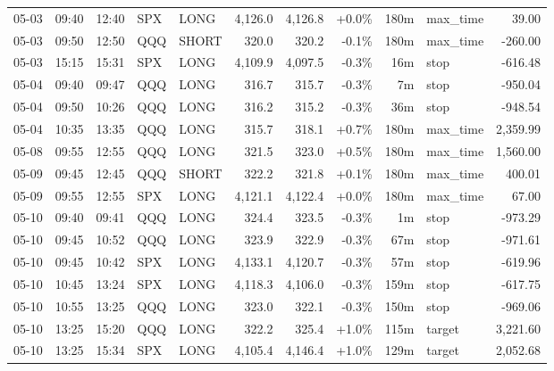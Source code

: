 \documentclass[11pt,a4paper,twoside]{article}
\begin{document}
\begin{center}
\begin{longtable}{>{\color{txtmain}}l l l l l r r r r >{\color{txtmain}}l r}
05-03 & 09:40 & 12:40 & SPX & LONG & 4,126.0 & 4,126.8 & \textcolor{wingreen}{+0.0\%} & 180m & max\_time & \textcolor{wingreen}{39.00} \\
05-03 & 09:50 & 12:50 & QQQ & SHORT & 320.0 & 320.2 & \textcolor{lossred}{-0.1\%} & 180m & max\_time & \textcolor{lossred}{-260.00} \\
05-03 & 15:15 & 15:31 & SPX & LONG & 4,109.9 & 4,097.5 & \textcolor{lossred}{-0.3\%} & 16m & stop & \textcolor{lossred}{-616.48} \\
05-04 & 09:40 & 09:47 & QQQ & LONG & 316.7 & 315.7 & \textcolor{lossred}{-0.3\%} & 7m & stop & \textcolor{lossred}{-950.04} \\
05-04 & 09:50 & 10:26 & QQQ & LONG & 316.2 & 315.2 & \textcolor{lossred}{-0.3\%} & 36m & stop & \textcolor{lossred}{-948.54} \\
05-04 & 10:35 & 13:35 & QQQ & LONG & 315.7 & 318.1 & \textcolor{wingreen}{+0.7\%} & 180m & max\_time & \textcolor{wingreen}{2,359.99} \\
05-08 & 09:55 & 12:55 & QQQ & LONG & 321.5 & 323.0 & \textcolor{wingreen}{+0.5\%} & 180m & max\_time & \textcolor{wingreen}{1,560.00} \\
05-09 & 09:45 & 12:45 & QQQ & SHORT & 322.2 & 321.8 & \textcolor{wingreen}{+0.1\%} & 180m & max\_time & \textcolor{wingreen}{400.01} \\
05-09 & 09:55 & 12:55 & SPX & LONG & 4,121.1 & 4,122.4 & \textcolor{wingreen}{+0.0\%} & 180m & max\_time & \textcolor{wingreen}{67.00} \\
05-10 & 09:40 & 09:41 & QQQ & LONG & 324.4 & 323.5 & \textcolor{lossred}{-0.3\%} & 1m & stop & \textcolor{lossred}{-973.29} \\
05-10 & 09:45 & 10:52 & QQQ & LONG & 323.9 & 322.9 & \textcolor{lossred}{-0.3\%} & 67m & stop & \textcolor{lossred}{-971.61} \\
05-10 & 09:45 & 10:42 & SPX & LONG & 4,133.1 & 4,120.7 & \textcolor{lossred}{-0.3\%} & 57m & stop & \textcolor{lossred}{-619.96} \\
05-10 & 10:45 & 13:24 & SPX & LONG & 4,118.3 & 4,106.0 & \textcolor{lossred}{-0.3\%} & 159m & stop & \textcolor{lossred}{-617.75} \\
05-10 & 10:55 & 13:25 & QQQ & LONG & 323.0 & 322.1 & \textcolor{lossred}{-0.3\%} & 150m & stop & \textcolor{lossred}{-969.06} \\
05-10 & 13:25 & 15:20 & QQQ & LONG & 322.2 & 325.4 & \textcolor{wingreen}{+1.0\%} & 115m & target & \textcolor{wingreen}{3,221.60} \\
05-10 & 13:25 & 15:34 & SPX & LONG & 4,105.4 & 4,146.4 & \textcolor{wingreen}{+1.0\%} & 129m & target & \textcolor{wingreen}{2,052.68} \\

\end{longtable}
\end{center}
\end{document}
